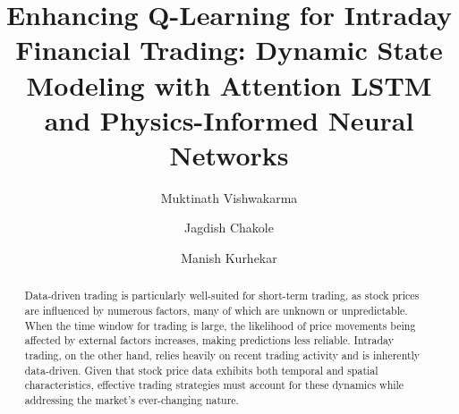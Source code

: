 \documentclass[preprint,review,12pt]{elsarticle}
\begin{document}
\begin{frontmatter}



\title{Enhancing Q-Learning for Intraday Financial Trading: Dynamic State Modeling with Attention LSTM and Physics-Informed Neural Networks}

 \author[label1]{Muktinath Vishwakarma}
 \author[label2]{Jagdish Chakole}
 \author[label1]{Manish Kurhekar}

	
	
\begin{abstract}
 Data-driven trading is particularly well-suited for short-term trading, as stock prices are influenced by numerous factors, many of which are unknown or unpredictable. When the time window for trading is large, the likelihood of price movements being affected by external factors increases, making predictions less reliable. Intraday trading, on the other hand, relies heavily on recent trading activity and is inherently data-driven. Given that stock price data exhibits both temporal and spatial characteristics, effective trading strategies must account for these dynamics while addressing the market's ever-changing nature.
 

\end{abstract}
\end{frontmatter}
\end{document}
